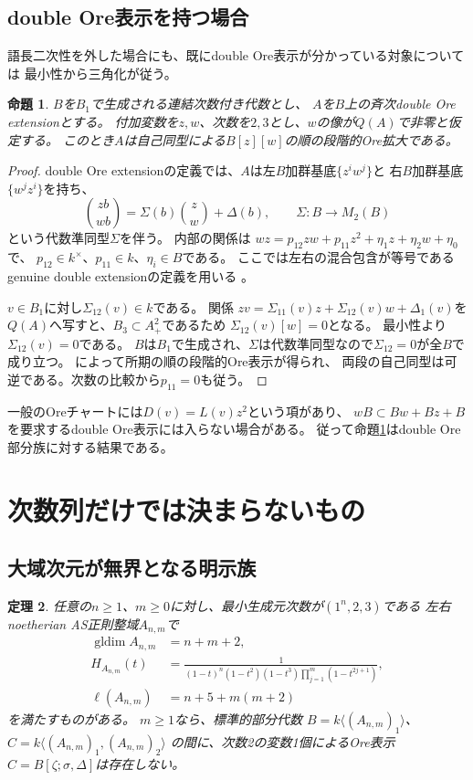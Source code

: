 \documentclass[11pt,a4paper]{ltjsarticle}
\newtheorem{theorem}{定理}[section]
\newtheorem{proposition}[theorem]{命題}
\theoremstyle{definition}
\newcommand{\gldim}{\operatorname{gldim}}
\begin{document}
\subsection{double Ore表示を持つ場合}\label{subsec:double-ore}
語長二次性を外した場合にも、既にdouble Ore表示が分かっている対象については
最小性から三角化が従う。

\begin{proposition}\label{prop:double-triangular}
$B$を$B_1$で生成される連結次数付き代数とし、
$A$を$B$上の斉次double Ore extensionとする。
付加変数を$z,w$、次数を$2,3$とし、$w$の像が$Q(A)$で非零と仮定する。
このとき$A$は自己同型による$B[z][w]$の順の段階的Ore拡大である。
\end{proposition}

\begin{proof}
double Ore extensionの定義では、$A$は左$B$加群基底$\{z^iw^j\}$と
右$B$加群基底$\{w^jz^i\}$を持ち、
\[
\binom{zb}{wb}=
\Sigma(b)\binom zw+\Delta(b),\qquad
\Sigma:B\longrightarrow M_2(B)
\]
という代数準同型$\Sigma$を伴う。
内部の関係は
$wz=p_{12}zw+p_{11}z^2+\eta_1z+\eta_2w+\eta_0$で、
$p_{12}\in k^\times$、$p_{11}\in k$、$\eta_i\in B$である。
ここでは左右の混合包含が等号であるgenuine double extensionの定義を用いる
\cite[Definition 1.1]{CLM}。

$v\in B_1$に対し$\Sigma_{12}(v)\in k$である。
関係
$zv=\Sigma_{11}(v)z+\Sigma_{12}(v)w+\Delta_1(v)$を
$Q(A)$へ写すと、$B_3\subset A_+^2$であるため
$\Sigma_{12}(v)[w]=0$となる。
最小性より$\Sigma_{12}(v)=0$である。
$B$は$B_1$で生成され、$\Sigma$は代数準同型なので$\Sigma_{12}=0$が全$B$で成り立つ。
\cite[Theorem 2.2(a),(b)]{CLM}によって所期の順の段階的Ore表示が得られ、
両段の自己同型は可逆である。次数の比較から$p_{11}=0$も従う。
\end{proof}

一般のOreチャートには$D(v)=L(v)z^2$という項があり、
$wB\subset Bw+Bz+B$を要求するdouble Ore表示には入らない場合がある。
従って命題\ref{prop:double-triangular}はdouble Ore部分族に対する結果である。

\section{次数列だけでは決まらないもの}\label{sec:examples}
\subsection{大域次元が無界となる明示族}
\begin{theorem}\label{thm:unbounded-dimension}
任意の$n\geq1$、$m\geq0$に対し、最小生成元次数が$(1^n,2,3)$である
左右noetherian AS正則整域$A_{n,m}$で
\begin{align}
\gldim A_{n,m}&=n+m+2,\label{eq:filiform-dimension}\\
H_{A_{n,m}}(t)&=
\frac1{(1-t)^n(1-t^2)(1-t^3)\prod_{j=1}^m(1-t^{2j+1})},\label{eq:filiform-hilbert}\\
\ell(A_{n,m})&=n+5+m(m+2)\label{eq:filiform-index}
\end{align}
を満たすものがある。
$m\geq1$なら、標準的部分代数
$B=k\langle(A_{n,m})_1\rangle$、
$C=k\langle(A_{n,m})_1,(A_{n,m})_2\rangle$
の間に、次数2の変数1個によるOre表示$C=B[\zeta;\sigma,\Delta]$は存在しない。
\end{theorem}
\end{document}
